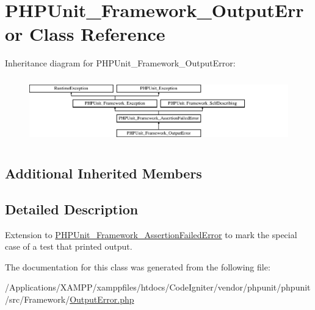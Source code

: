 \hypertarget{class_p_h_p_unit___framework___output_error}{}\section{P\+H\+P\+Unit\+\_\+\+Framework\+\_\+\+Output\+Error Class Reference}
\label{class_p_h_p_unit___framework___output_error}
Inheritance diagram for P\+H\+P\+Unit\+\_\+\+Framework\+\_\+\+Output\+Error\+:\begin{figure}[H]
\begin{center}
\leavevmode
\includegraphics[height=2.860792cm]{class_p_h_p_unit___framework___output_error}
\end{center}
\end{figure}
\subsection*{Additional Inherited Members}


\subsection{Detailed Description}
Extension to \mbox{\hyperlink{class_p_h_p_unit___framework___assertion_failed_error}{P\+H\+P\+Unit\+\_\+\+Framework\+\_\+\+Assertion\+Failed\+Error}} to mark the special case of a test that printed output. 

The documentation for this class was generated from the following file\+:\begin{DoxyCompactItemize}
\item 
/\+Applications/\+X\+A\+M\+P\+P/xamppfiles/htdocs/\+Code\+Igniter/vendor/phpunit/phpunit/src/\+Framework/\mbox{\hyperlink{_output_error_8php}{Output\+Error.\+php}}\end{DoxyCompactItemize}
